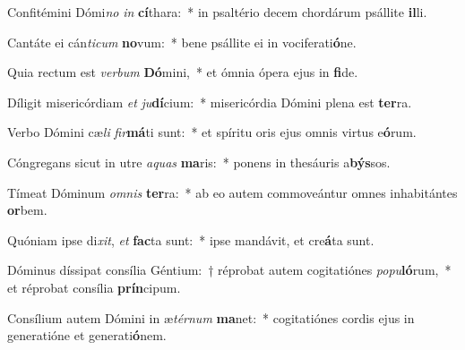\item Confitémini Dómi\textit{no} \textit{in} \textbf{cí}thara:~* in psaltério decem chordárum psállite \textbf{il}li.
\item Cantáte ei cán\textit{ti}\textit{cum} \textbf{no}vum:~* bene psállite ei in vociferati\textbf{ó}ne.
\item Quia rectum est \textit{ver}\textit{bum} \textbf{Dó}mini,~* et ómnia ópera ejus in \textbf{fi}de.
\item Díligit misericórdiam \textit{et} \textit{ju}\textbf{dí}cium:~* misericórdia Dómini plena est \textbf{ter}ra.
\item Verbo Dómini cæ\textit{li} \textit{fir}\textbf{má}ti sunt:~* et spíritu oris ejus omnis virtus e\textbf{ó}rum.
\item Cóngregans sicut in utre \textit{a}\textit{quas} \textbf{ma}ris:~* ponens in thesáuris a\textbf{býs}sos.
\item Tímeat Dóminum \textit{om}\textit{nis} \textbf{ter}ra:~* ab eo autem commoveántur omnes inhabitántes \textbf{or}bem.
\item Quóniam ipse di\textit{xit}, \textit{et} \textbf{fac}ta sunt:~* ipse mandávit, et cre\textbf{á}ta sunt.
\item Dóminus díssipat consília Géntium:~† réprobat autem cogitatiónes \textit{po}\textit{pu}\textbf{ló}rum,~* et réprobat consília \textbf{prín}cipum.
\item Consílium autem Dómini in æ\textit{tér}\textit{num} \textbf{ma}net:~* cogitatiónes cordis ejus in generatióne et generati\textbf{ó}nem.

